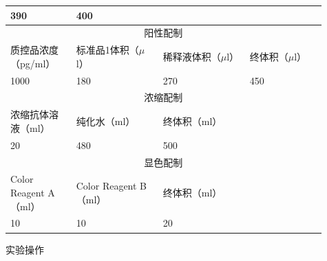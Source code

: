 \documentclass[UTF8,10pt,a4paper,fontset=fandol]{ctexart}
\newcommand{\fieldvalue}[1]{#1}
\newcommand{\handwritten}[1]{#1}
\begin{document}
\begin{tabular}{|p{0.19\linewidth}|p{0.25\linewidth}|p{0.25\linewidth}|p{0.22\linewidth}|}
\fieldvalue{\handwritten{390}} &
\fieldvalue{\handwritten{400}}\\
\hline
\multicolumn{4}{|c|}{阳性配制}\\
\hline
质控品浓度（pg/ml） & 标准品1体积（$\mu$l） & 稀释液体积（$\mu$l） & 终体积（$\mu$l）\\
\hline
\fieldvalue{\handwritten{1000}} &
\fieldvalue{\handwritten{180}} &
\fieldvalue{\handwritten{270}} &
\fieldvalue{\handwritten{450}}\\
\hline
\multicolumn{4}{|c|}{浓缩配制}\\
\hline
浓缩抗体溶液（ml） & 纯化水（ml） & 终体积（ml） & \\
\hline
\fieldvalue{\handwritten{20}} &
\fieldvalue{\handwritten{480}} &
\fieldvalue{\handwritten{500}} &
\\
\hline
\multicolumn{4}{|c|}{显色配制}\\
\hline
Color Reagent A（ml） & Color Reagent B（ml） & 终体积（ml） & \\
\hline
\fieldvalue{\handwritten{10}} &
\fieldvalue{\handwritten{10}} &
\fieldvalue{\handwritten{20}} &
\\
\hline
\end{tabular}

\begin{center}
实验操作
\end{center}
\end{document}
